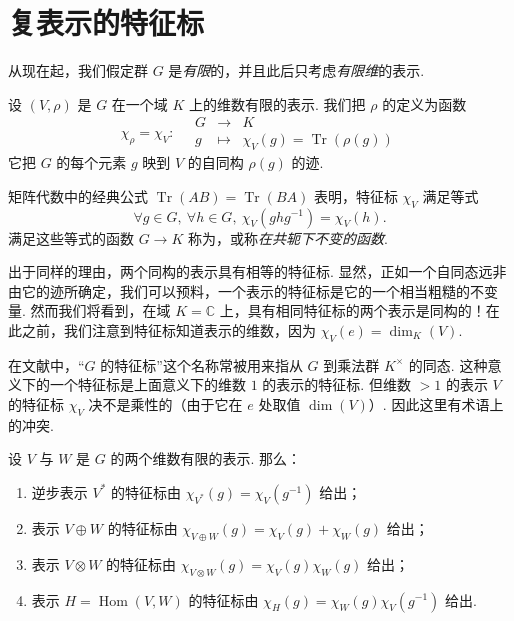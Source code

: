 \section{复表示的特征标}\label{sec:fg-4-2}

从现在起，我们假定群 $G$ 是\emph{有限}的，并且此后只考虑\emph{有限维}的表示.

\begin{definition}\label{def:fg-4-2-1}
设 $(V,\rho)$ 是 $G$ 在一个域 $K$ 上的维数有限的表示. 我们把 $\rho$ 的定义为函数
\[
\chi_\rho=\chi_V:\quad
\begin{array}{rcl}
G & \longrightarrow & K\\
g & \longmapsto & \chi_V(g)=\operatorname{Tr}(\rho(g))
\end{array}
\]
它把 $G$ 的每个元素 $g$ 映到 $V$ 的自同构 $\rho(g)$ 的迹.
\end{definition}

矩阵代数中的经典公式 $\operatorname{Tr}(AB)=\operatorname{Tr}(BA)$ 表明，特征标 $\chi_V$ 满足等式
\[
\forall g\in G,\ \forall h\in G,\ \chi_V(ghg^{-1})=\chi_V(h).
\]
满足这些等式的函数 $G\longrightarrow K$ 称为，或称\emph{在共轭下不变的函数}.

出于同样的理由，两个同构的表示具有相等的特征标. 显然，正如一个自同态远非由它的迹所确定，我们可以预料，一个表示的特征标是它的一个相当粗糙的不变量. 然而我们将看到，在域 $K=\mathbb{C}$ 上，具有相同特征标的两个表示是同构的！在此之前，我们注意到特征标知道表示的维数，因为 $\chi_V(e)=\dim_K(V)$.

\begin{remark}\label{rem:fg-4-2-2}
在文献中，``$G$ 的特征标''这个名称常被用来指从 $G$ 到乘法群 $K^\times$ 的同态. 这种意义下的一个特征标是上面意义下的维数 $1$ 的表示的特征标. 但维数 $>1$ 的表示 $V$ 的特征标 $\chi_V$ 决不是乘性的（由于它在 $e$ 处取值 $\dim(V)$）. 因此这里有术语上的冲突.
\end{remark}

\begin{theorem}\label{thm:fg-4-2-3}
设 $V$ 与 $W$ 是 $G$ 的两个维数有限的表示. 那么：
\begin{enumerate}[label=\roman*)]
\item 逆步表示 $V^*$ 的特征标由 $\chi_{V^*}(g)=\chi_V(g^{-1})$ 给出；
\item 表示 $V\oplus W$ 的特征标由 $\chi_{V\oplus W}(g)=\chi_V(g)+\chi_W(g)$ 给出；
\item 表示 $V\otimes W$ 的特征标由 $\chi_{V\otimes W}(g)=\chi_V(g)\chi_W(g)$ 给出；
\item 表示 $H=\operatorname{Hom}(V,W)$ 的特征标由 $\chi_H(g)=\chi_W(g)\chi_V(g^{-1})$ 给出.
\end{enumerate}
\end{theorem}

